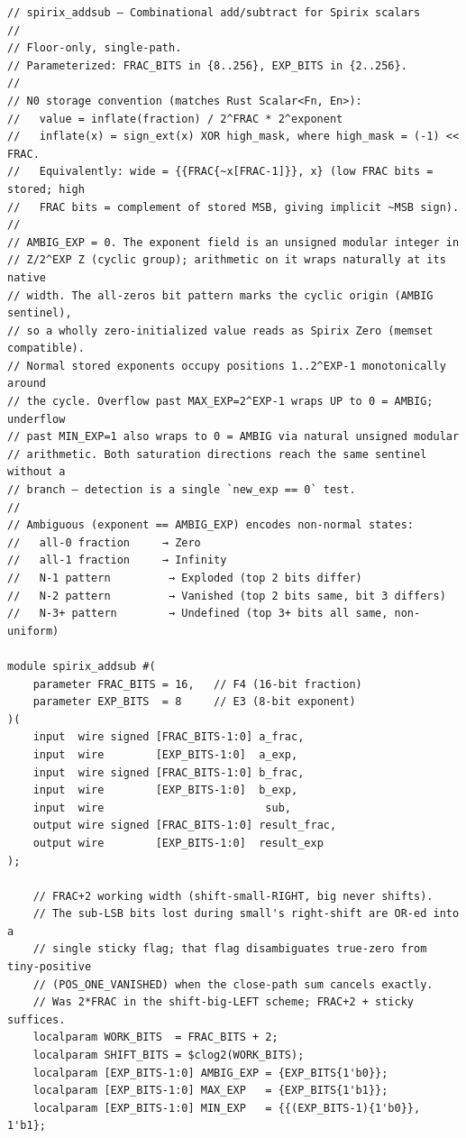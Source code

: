 \documentclass[12pt,letter]{article}
\begin{document}
\newpage
\begin{lstlisting}[style=verilog, caption={Verilog Implementation of Scalar Add/Subtract at F4E3 (16-bit fraction, 8-bit exponent), floor-only canonical design. The IEEE-754 reference comparison numbers in the synthesis table above measure the same architecture extended with banker's RNE rounding at FRAC\_BITS=24, EXP\_BITS=8 for binary32 parity.}, label={fig:scalar_subtract}]
// spirix_addsub — Combinational add/subtract for Spirix scalars
//
// Floor-only, single-path.
// Parameterized: FRAC_BITS in {8..256}, EXP_BITS in {2..256}.
//
// N0 storage convention (matches Rust Scalar<Fn, En>):
//   value = inflate(fraction) / 2^FRAC * 2^exponent
//   inflate(x) = sign_ext(x) XOR high_mask, where high_mask = (-1) << FRAC.
//   Equivalently: wide = {{FRAC{~x[FRAC-1]}}, x} (low FRAC bits = stored; high
//   FRAC bits = complement of stored MSB, giving implicit ~MSB sign).
//
// AMBIG_EXP = 0. The exponent field is an unsigned modular integer in
// Z/2^EXP Z (cyclic group); arithmetic on it wraps naturally at its native
// width. The all-zeros bit pattern marks the cyclic origin (AMBIG sentinel),
// so a wholly zero-initialized value reads as Spirix Zero (memset compatible).
// Normal stored exponents occupy positions 1..2^EXP-1 monotonically around
// the cycle. Overflow past MAX_EXP=2^EXP-1 wraps UP to 0 = AMBIG; underflow
// past MIN_EXP=1 also wraps to 0 = AMBIG via natural unsigned modular
// arithmetic. Both saturation directions reach the same sentinel without a
// branch — detection is a single `new_exp == 0` test.
//
// Ambiguous (exponent == AMBIG_EXP) encodes non-normal states:
//   all-0 fraction     → Zero
//   all-1 fraction     → Infinity
//   N-1 pattern         → Exploded (top 2 bits differ)
//   N-2 pattern         → Vanished (top 2 bits same, bit 3 differs)
//   N-3+ pattern        → Undefined (top 3+ bits all same, non-uniform)

module spirix_addsub #(
    parameter FRAC_BITS = 16,   // F4 (16-bit fraction)
    parameter EXP_BITS  = 8     // E3 (8-bit exponent)
)(
    input  wire signed [FRAC_BITS-1:0] a_frac,
    input  wire        [EXP_BITS-1:0]  a_exp,
    input  wire signed [FRAC_BITS-1:0] b_frac,
    input  wire        [EXP_BITS-1:0]  b_exp,
    input  wire                         sub,
    output wire signed [FRAC_BITS-1:0] result_frac,
    output wire        [EXP_BITS-1:0]  result_exp
);

    // FRAC+2 working width (shift-small-RIGHT, big never shifts).
    // The sub-LSB bits lost during small's right-shift are OR-ed into a
    // single sticky flag; that flag disambiguates true-zero from tiny-positive
    // (POS_ONE_VANISHED) when the close-path sum cancels exactly.
    // Was 2*FRAC in the shift-big-LEFT scheme; FRAC+2 + sticky suffices.
    localparam WORK_BITS  = FRAC_BITS + 2;
    localparam SHIFT_BITS = $clog2(WORK_BITS);
    localparam [EXP_BITS-1:0] AMBIG_EXP = {EXP_BITS{1'b0}};
    localparam [EXP_BITS-1:0] MAX_EXP   = {EXP_BITS{1'b1}};
    localparam [EXP_BITS-1:0] MIN_EXP   = {{(EXP_BITS-1){1'b0}}, 1'b1};


\end{lstlisting}
\end{document}
